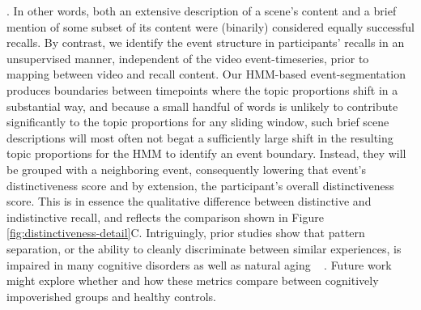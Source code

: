 \documentclass{article}
\begin{document}
{{\citep{ChenEtal17}}\hspace{0pt}%
.  In other words, both an extensive description of a scene's content and a brief mention of some subset of its content were (binarily) considered equally successful recalls.  By contrast, we identify the event structure in participants' recalls in an unsupervised manner, independent of the video event-timeseries, prior to mapping between video and recall content.  Our HMM-based event-segmentation produces boundaries between timepoints where the topic proportions shift in a substantial way, and because a small handful of words is unlikely to contribute significantly to the topic proportions for any sliding window, such brief scene descriptions will most often not begat a sufficiently large shift in the resulting topic proportions for the HMM to identify an event boundary.  Instead, they will be grouped with a neighboring event, consequently lowering that event's distinctiveness score and by extension, the participant's overall distinctiveness score.  This is in essence the qualitative difference between distinctive and indistinctive recall, and reflects the comparison shown in Figure \ref{fig:distinctiveness-detail}C.  Intriguingly, prior studies show that pattern separation, or the ability to cleanly discriminate between similar experiences, is impaired in many cognitive disorders as well as natural aging \mbox{%
\citep{StarEtal10, YassEtal11c, YassStar11b}}\hspace{0pt}%
.  Future work might explore whether and how these metrics compare between cognitively impoverished groups and healthy controls.
}
\end{document}

